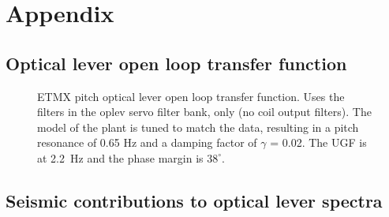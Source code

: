 \chapter{Appendix}



\section{Optical lever open loop transfer function}
\begin{figure}
\begin{centering}
\caption[Optical lever open loop transfer function]{ETMX pitch optical
  lever open loop transfer function. Uses the filters in the oplev
  servo filter bank, only (no coil output filters). The model of the
  plant is tuned to match the data, resulting in a pitch resonance of
  0.65 Hz and a damping factor of $\gamma$ = 0.02. The UGF is at
  2.2~Hz and the phase margin is $38^\circ$.}
\label{fig:oplevOLG}
\end{centering}
\end{figure}



\section{Seismic contributions to optical lever spectra}
\label{sec:oplev_contributions}

